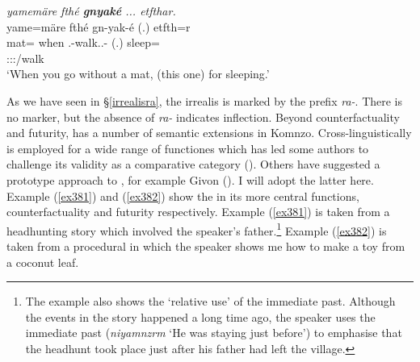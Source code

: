 \begin{exe}
	\ex \emph{yamemäre fthé \textbf{gnyaké} ... etfthar.}\\
	\glll yame=märe fthé gn-yak-é (.) etfth=r\\
	mat=\Priv{} when \Stsg.\Bet-walk.\Ext.\Ndu-\Imp{} (.) sleep=\Purp\\
	{} {} \footnotesize{\Ssg:\Sbj:\Imp:\Ipfv/walk} {} {}\\
	\trans `When you go without a mat, (this one) for sleeping.'\\
	\label{ex318}
\end{exe}

As we have seen in \S{}\ref{irrealisra}, the irrealis is marked by the prefix \emph{ra-}. There is no  marker, but the absence of \emph{ra-} indicates  inflection. Beyond counterfactuality and futurity,   has a number of semantic extensions in Komnzo. Cross-linguistically   is employed for a wide range of functiones which has led some authors to challenge its validity as a comparative category (\citealt{Bybee:irrealis}). Others have suggested a prototype approach to  , for example Givon (\citeyear[327]{Givon:1994ko}). I will adopt the latter here. Example (\ref{ex381}) and (\ref{ex382}) show the   in its more central functions, counterfactuality and futurity respectively. Example (\ref{ex381}) is taken from a headhunting story which involved the speaker's father.\footnote{The example also shows the `relative use' of the immediate past. Although the events in the story happened a long time ago, the speaker uses the immediate past (\emph{niyamnzrm} `He was staying just before') to emphasise that the headhunt took place just after his father had left the village.} Example (\ref{ex382}) is taken from a procedural in which the speaker shows me how to make a toy from a coconut leaf.

